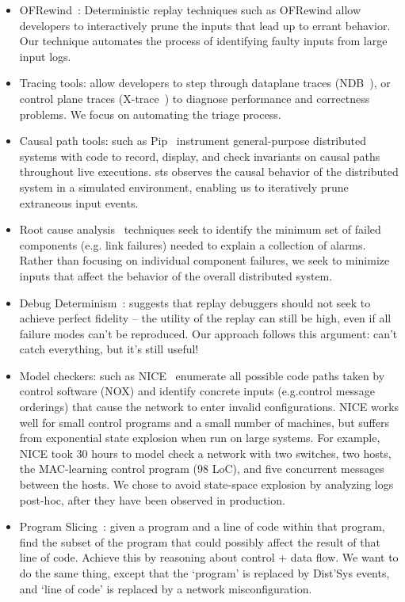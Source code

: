 \begin{itemize}
\item OFRewind~\cite{ofrewind}: Deterministic replay techniques such as OFRewind allow developers to interactively prune the inputs that lead up to errant behavior. Our technique automates the process of identifying faulty inputs from large input logs.
\item Tracing tools: allow developers to step through dataplane traces (NDB~\cite{handigol2012debugger}), or control plane traces (X-trace~\cite{fonseca2007x}) to diagnose performance and correctness problems. We focus on automating the triage process.
\item Causal path tools: such as Pip~\cite{pip} instrument general-purpose distributed systems
with code to record, display, and check invariants on causal paths throughout
live executions. sts observes the causal behavior of the
distributed system in a simulated environment, enabling us to iteratively prune extraneous input events.
\item Root cause analysis~\cite{577079} techniques seek to identify the minimum set of failed
components (e.g. link failures) needed to explain a collection of alarms. Rather than
focusing on individual component failures, we seek to minimize inputs that affect the behavior
of the overall distributed system.
\item Debug Determinism~\cite{zamfir2011debug}: suggests that replay debuggers should not seek to achieve perfect fidelity -- the utility of the replay can still be high, even if all failure modes can't be reproduced. Our approach follows this argument: can't catch everything, but it's still useful!
\end{itemize}


\begin{itemize}
\item Model checkers: such as NICE~\cite{nice} enumerate all possible code paths taken by control software (NOX)
and identify concrete inputs (e.g.control message orderings) that cause
the network to enter invalid configurations. NICE works well for small
control programs and a small number of machines, but suffers from exponential
state explosion when run on large systems. For example, NICE took 30 hours to
model check a network with two switches, two hosts, the MAC-learning
control program (98 LoC), and five concurrent
messages between the hosts. We chose to avoid state-space explosion by analyzing logs post-hoc, after they have been observed in production.
\item Program Slicing~\cite{weiser1981program}: given a program and a line of code
within that program, find the subset of the program that could possibly affect
the result of that line of code. Achieve this by reasoning about control +
data flow. We want to do the same thing, except that the `program' is replaced
by Dist'Sys events, and `line of code' is replaced by a network misconfiguration.
\end{itemize}


